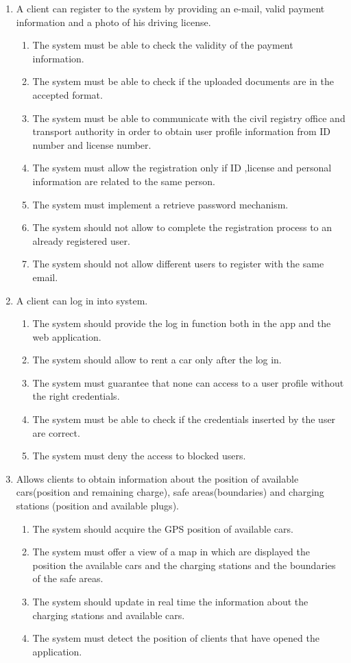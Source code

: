 \begin{enumerate}
\item A client can register to the system by providing an e-mail, valid payment information and a photo of his driving license.
\begin{enumerate}
\item The system must be able to check the validity of the payment information.
\item The system must be able to check if the uploaded documents are in the accepted format.
\item The system must be able to communicate with the civil registry office and transport authority in order to obtain user profile information from ID number and license number. 
\item The system must allow the registration only if ID ,license and personal information are related to the same person.
\item The system must implement a retrieve password mechanism.
\item The system should not allow to complete the registration process to an already registered user.
\item The system should not allow different users to register with the same email.
\end{enumerate}

\item A client can log in into system.
\begin{enumerate}
\item The system should provide the log in function both in the app and the web application.
\item The system should allow to rent a car only after the log in.
\item The system must guarantee that none can access to a user profile without the right credentials.
\item The system must be able to check if the credentials inserted by the user are correct.
\item The system must deny the access to blocked users.
\end{enumerate}

\item Allows clients to obtain information about
the position of available cars(position and remaining charge), safe areas(boundaries) and charging stations (position and available plugs).
\begin{enumerate}
\item The system should acquire the GPS position of available cars.
\item The system must offer a view of a map in which are displayed the position the available cars and the charging stations and the boundaries of the safe areas.
\item The system should update in real time the information about the charging stations and available cars.
\item The system must detect the position of clients that have opened the application.
\end{enumerate}



\end{enumerate}
